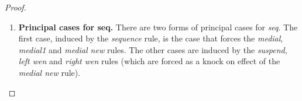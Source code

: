\begin{proof}
\begin{enumerate}[label=\textbf{\Alph*},ref=\Alph*,leftmargin=*]
\begin{enumerate}[label*=\textbf{.\arabic*}]
\begin{comment}
In the second case, $\hat{W}_i = \tcontextn{i}{ V^i_j \colon 1 \leq j \leq m_i }$ and, since $\nfv{y}{R}$, by Lemma~\ref{lemma:nfv} we have $\nfv{y}{\hat{W}_i}$.
Hence the following proof can be constructed, using the above proof:
$
\wen y P \cpar \hat{W}_i
\longrightarrow
\new y \left( P \cpar \tcontextn{i}{ V^i_j \colon 1 \leq j \leq m_i } \right)
\longrightarrow
\cunit
$.
Furthermore, by Lemma~\ref{lemma:bound}, $\size{ \tcontextn{i}{ V^i_j \colon 1 \leq j \leq m_i } } \preceq \size{ Q }$.
Hence $\size{\wen y P \cpar \tcontextn{i}{ V^i_j \colon 1 \leq j \leq m_i }} \prec \size{\new x \wen y P \cpar Q}$.
\end{comment}

\end{enumerate}



\item \textbf{Principal cases for seq.} There are two forms of principal cases for \textit{seq}.
The first case, induced by the \textit{sequence} rule, is the case that forces the \textit{medial}, \textit{medial1} and \textit{medial new} rules.
The other cases are induced by the \textit{suspend}, \textit{left wen} and \textit{right wen} rules (which are forced as a knock on effect of the \textit{medial new} rule).


\end{enumerate}
\end{proof}
